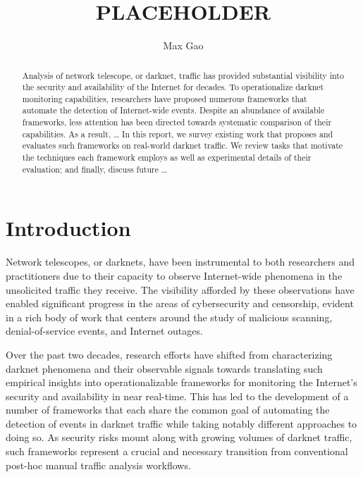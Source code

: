\documentclass[manuscript,nonacm]{acmart}
\begin{document}
\title{PLACEHOLDER}
\author{Max Gao}

\begin{abstract}
Analysis of network telescope, or darknet, traffic has provided substantial visibility into the security and availability of the Internet for decades.
To operationalize darknet monitoring capabilities, researchers have proposed numerous frameworks that automate the detection of Internet-wide events.
Despite an abundance of available frameworks, less attention has been directed towards systematic comparison of their capabilities. 
As a result, \dots
In this report, we survey existing work that proposes and evaluates such frameworks on real-world darknet traffic.
We review tasks that motivate the techniques each framework employs as well as experimental details of their evaluation; and finally, discuss future \dots
\end{abstract}

\maketitle

\section{Introduction}

Network telescopes, or darknets, have been instrumental to both researchers and practitioners due to their capacity to observe Internet-wide phenomena in the unsolicited traffic they receive. 
The visibility afforded by these observations have enabled significant progress in the areas of cybersecurity and censorship, evident in a rich body of work that centers around the study of malicious scanning, denial-of-service events, and Internet outages. 

Over the past two decades, research efforts have shifted from characterizing darknet phenomena and their observable signals towards translating such empirical insights into operationalizable frameworks for monitoring the Internet's security and availability in near real-time.  
This has led to the development of a number of frameworks that each share the common goal of automating the detection of events in darknet traffic while taking notably different approaches to doing so.
As security risks mount along with growing volumes of darknet traffic, such frameworks represent a crucial and necessary transition from conventional post-hoc manual traffic analysis workflows.
\end{document}
